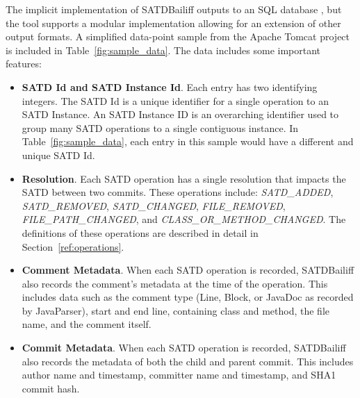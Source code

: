 \documentclass[3p]{elsarticle}
\newcommand{\approach}{SATDBailiff\xspace}
\newcommand*\circled[1]{\tikz[baseline=(char.base)]{
            \node[shape=circle,draw,inner sep=2pt] (char) {#1};}}
\newcommand{\eman}[1]{\textcolor{red}{{\it [Eman says: #1]}}}
\begin{document}
The implicit implementation of \approach outputs to an SQL database \circled{6}, but the tool supports a modular implementation allowing for an extension of other output formats. A simplified data-point sample from the Apache Tomcat project is included in Table~\ref{fig:sample_data}.
The data includes some important features:
\begin{itemize}
    \item \textbf{SATD Id and SATD Instance Id}. Each entry has two identifying integers. The SATD Id is a unique identifier for a single operation to an SATD Instance. An SATD Instance ID is an overarching identifier used to group many SATD operations to a single contiguous instance. In Table~\ref{fig:sample_data}, 
    each entry in this sample would have a different and unique SATD Id.
    \item \textbf{Resolution}. Each SATD operation has a single resolution that impacts the SATD between two commits. These operations include: \textit{SATD\_ADDED}, \textit{SATD\_REMOVED}, \textit{SATD\_CHANGED}, \textit{FILE\_REMOVED}, \textit{FILE\_PATH\_CHANGED}, and \textit{CLASS\_OR\_METHOD\_CHANGED}. The definitions of these operations are described in detail in Section~\ref{ref:operations}.
    \item \textbf{Comment Metadata}. When each SATD operation is recorded, \approach also records the comment's metadata at the time of the operation. This includes data such as the comment type (Line, Block, or JavaDoc as recorded by JavaParser), start and end line, containing class and method, the file name, and the comment itself.
    \item \textbf{Commit Metadata}. When each SATD operation is recorded, \approach also records the metadata of both the child and parent commit. This includes author name and timestamp, committer name and timestamp, and SHA1 commit hash.
\end{itemize}

\begin{comment}
\begin{table}
    \centering
    \caption{Simplified sample data from the Apache Tomcat project \eman{we need to add SATD Id as requested by the reviewer}}
    \begin{tabular}{ |p{4.7em}|p{12em}|p{3.6em}|p{6em}|}
     \hline
     \textbf{instance\_id} & \textbf{resolution} & \textbf{commit} & \textbf{comment}\\
     \hline
     789 & SATD\_ADDED   & 09b640e & TODO: 404\\
     789 & FILE\_PATH\_CHANGED & decfe2a & TODO: 404\\ 
     789 & FILE\_REMOVED & a457153 & None\\
    
     \hline
    \end{tabular}
    
    \label{fig:sample_data}
\end{table}

\end{comment}
\end{document}

